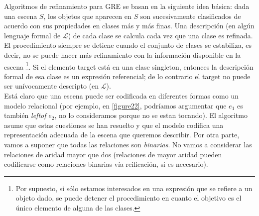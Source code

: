 
Algoritmos de refinamiento para GRE se basan en la siguiente idea b\'asica:
dada una escena $S$, los objetos que aparecen en $S$ son sucesivamente
clasificados de acuerdo con sus propiedades en clases m\'as y m\'as finas. 
Una descripci\'on (en alg\'un lenguaje formal de $\mathcal{L}$) de cada
clase se calcula cada vez que una clase es refinada. El procedimiento siempre
se detiene cuando el conjunto de clases se estabiliza, es decir, no se puede hacer m\'as refinamiento
con la informaci\'on disponible en la escena \footnote{Por supuesto, si s\'olo estamos interesados en una expresi\'on que se refiere a un objeto dado, se puede detener el procedimiento en cuanto el objetivo es el
   \'unico elemento de alguna de las clases.}. Si el elemento target est\'a en
una clase singleton, entonces la descripci\'on formal de esa clase es un
expresi\'on referencial; de lo contrario el target no puede ser un\'{i}vocamente
descripto (en $\mathcal{L}$).\\


Est\'a claro que una escena puede ser codificada en diferentes formas como un
modelo relacional (por ejemplo, en \ref{figure22}, podr\'{i}amos argumentar que
$e_1$ es tambi\'en \emph{leftof} $e_2$, no lo consideramos porque no se estan 
tocando). El algoritmo asume que estas cuestiones se han resuelto y que el modelo codifica una representaci\'on adecuada de la escena que
queremos describir. Por otra parte, vamos a suponer que todas las relaciones son
\emph{binarias}. No vamos a considerar las relaciones de aridad mayor que
dos (relaciones de mayor aridad pueden codificarse como relaciones binarias v\'{i}a
reificaci\'on, si es necesario).\\

